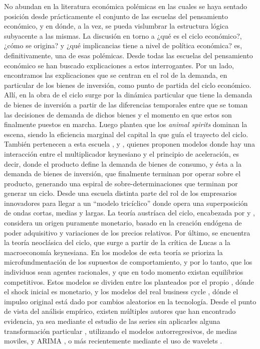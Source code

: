 \documentclass[a4paper]{article}
\begin{document}
No abundan en la literatura económica polémicas en las cuales se haya sentado posición desde prácticamente el conjunto de las escuelas del pensamiento económico, y en dónde, a la vez, se pueda vislumbrar la estructura lógica subyacente a las mismas. La discusión en torno a ¿qué es el ciclo económico?, ¿cómo se origina?  y ¿qué implicancias tiene a nivel de política económica? es, definitivamente, una de esas polémicas.
Desde todas las escuelas del pensamiento económico se han buscado explicaciones a estos interrogantes. Por un lado, encontramos las explicaciones que se centran en el rol de la demanda, en particular de los bienes de inversión, como punto de partida del ciclo económico. Allí, en la obra de \cite{kalecki2013essays} el ciclo surge por la dinámica particular que tiene la demanda de bienes de inversión a partir de las diferencias temporales entre que se toman las decisiones de demanda de dichos bienes y el momento en que estos son finalmente puestos en marcha. Luego \cite{keynes2018general} plantea que los \textit{animal spirits} dominan la escena, siendo la eficiencia marginal del capital la que guía el trayecto del ciclo. También pertenecen a esta escuela \cite{harrod1936trade}, \cite{kaldor1940model} y \cite{samuelson1939synthesis}, quienes proponen modelos donde hay una interacción entre el multiplicador keynesiano y el principio de aceleración, es decir, donde el producto define la demanda de bienes de consumo, y ésta a la demanda de bienes de inversión, que finalmente terminan por operar sobre el producto, generando una espiral de sobre-determinaciones que terminan por generar un ciclo. 
Desde una escuela distinta \cite{schumpeter1939business} parte del rol de los empresarios innovadores para llegar a un “modelo tricíclico” donde opera una superposición de ondas cortas, medias y largas. 
La teoría austríaca del ciclo, encabezada por \cite{hayek1933} y \cite{von1943elastic}, considera un origen puramente monetario, basado en la creación endógena de poder adquisitivo y variaciones de los precios relativos. 
Por último, se encuentra la teoría neoclásica del ciclo, que surge a partir de la crítica de Lucas a la macroeconomía keynesiana. En los modelos de esta teoría se prioriza la microfundmentación de los supuestos de comportamiento, y por lo tanto, que los individuos sean agentes racionales, y que en todo momento existan equilibrios competitivos. Estos modelos se dividen entre los planteados por el propio \cite{lucas1975equilibrium}, dónde el shock inicial es monetario, y los modelos del real business cycle \cite{plosser1989understanding}, dónde el impulso original está dado por cambios aleatorios en la tecnología.
Desde el punto de vista del análisis empírico, existen múltiples autores que han encontrado evidencia, ya sea mediante el estudio de las series sin aplicarles alguna transformación particular \citep{kuznets1930secular,kondratieff1979long,schumpeter1939business}, utilizando el modelos autorregresivos, de medias moviles, y ARIMA \citep{hamilton1989new,kaiser2012measuring}, o más recientemente mediante el uso de wavelets \citep{yogo2008measuring,soares2011business}.
\end{document}
